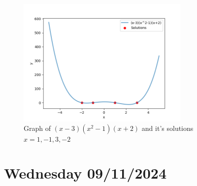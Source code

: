\begin{figure}[htbp]
  \centerline{\includegraphics[width=0.75\textwidth]{images/gradient_ex4.png}}
  \caption{Graph of $(x-3)(x^2-1)(x+2)$ and it's solutions $x = 1,-1,3,-2$}
  \label{fig:gradient_ex4}
\end{figure}

\section{Wednesday 09/11/2024}